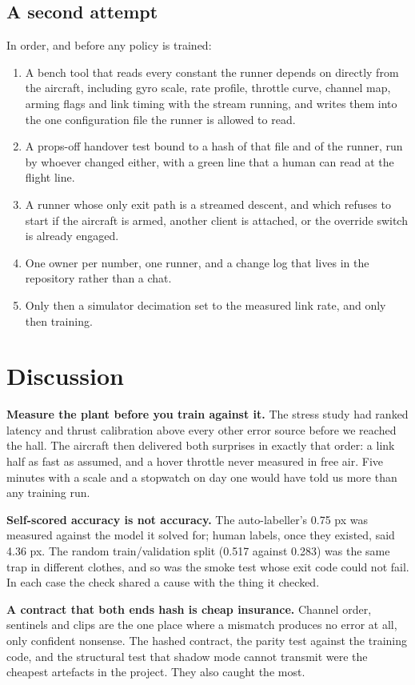 \documentclass{article}
\begin{document}
\subsection{A second attempt}
In order, and before any policy is trained:

\begin{enumerate}[leftmargin=*]
\item A bench tool that reads every constant the runner depends on directly from the aircraft, including gyro scale, rate profile, throttle curve, channel map, arming flags and link timing with the stream running, and writes them into the one configuration file the runner is allowed to read.
\item A props-off handover test bound to a hash of that file and of the runner, run by whoever changed either, with a green line that a human can read at the flight line.
\item A runner whose only exit path is a streamed descent, and which refuses to start if the aircraft is armed, another client is attached, or the override switch is already engaged.
\item One owner per number, one runner, and a change log that lives in the repository rather than a chat.
\item Only then a simulator decimation set to the measured link rate, and only then training.
\end{enumerate}
\section{Discussion}
\textbf{Measure the plant before you train against it.} The stress study had ranked latency and thrust calibration above every other error source before we reached the hall. The aircraft then delivered both surprises in exactly that order: a link half as fast as assumed, and a hover throttle never measured in free air. Five minutes with a scale and a stopwatch on day one would have told us more than any training run.

\textbf{Self-scored accuracy is not accuracy.} The auto-labeller's 0.75 px was measured against the model it solved for; human labels, once they existed, said 4.36 px. The random train/validation split (0.517 against 0.283) was the same trap in different clothes, and so was the smoke test whose exit code could not fail. In each case the check shared a cause with the thing it checked.

\textbf{A contract that both ends hash is cheap insurance.} Channel order, sentinels and clips are the one place where a mismatch produces no error at all, only confident nonsense. The hashed contract, the parity test against the training code, and the structural test that shadow mode cannot transmit were the cheapest artefacts in the project. They also caught the most.
\end{document}
